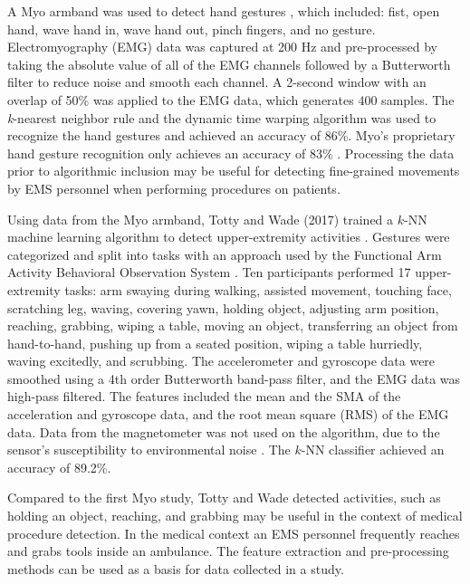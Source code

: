 \par A Myo armband was used to detect hand gestures \cite{Benalcazar2017}, which included: fist, open hand, wave hand in, wave hand out, pinch fingers, and no gesture. Electromyography (\gls{EMG}) data was captured at 200 Hz and pre-processed by taking the absolute value of all of the EMG channels followed by a Butterworth filter to reduce noise and smooth each channel. A 2-second window with an overlap of 50\% was applied to the EMG data, which generates 400 samples. The \emph{k}-nearest neighbor rule and the dynamic time warping algorithm was used to recognize the hand gestures and achieved an accuracy of 86\%. Myo's proprietary hand gesture recognition only achieves an accuracy of 83\% \cite{Benalcazar2017}. Processing the data prior to algorithmic inclusion may be useful for detecting fine-grained movements by EMS personnel when performing procedures on patients.
\par Using data from the Myo armband, Totty and Wade (2017) trained a $k$-NN machine learning algorithm to detect upper-extremity activities \cite{Totty2017}. Gestures were categorized and split into tasks with an approach used by the Functional Arm Activity Behavioral Observation System \cite{FAABOS}. Ten participants performed 17 upper-extremity tasks: arm swaying during walking, assisted movement, touching face, scratching leg, waving, covering yawn, holding object, adjusting arm position, reaching, grabbing, wiping a table, moving an object, transferring an object from hand-to-hand, pushing up from a seated position, wiping a table hurriedly, waving excitedly, and scrubbing. The accelerometer and gyroscope data were smoothed using a 4th order Butterworth band-pass filter, and the EMG data was high-pass filtered. The features included the mean and the \gls{SMA} of the acceleration and gyroscope data, and the root mean square (\gls{RMS}) of the \gls{EMG} data. Data from the magnetometer was not used on the algorithm, due to the sensor's susceptibility to environmental noise \cite{Ahmad2013}. The $k$-NN classifier achieved an accuracy of 89.2\%.
\par Compared to the first Myo study, Totty and Wade detected activities, such as holding an object, reaching, and grabbing may be useful in the context of medical procedure detection. In the medical context an EMS personnel frequently reaches and grabs tools inside an ambulance. The feature extraction and pre-processing methods can be used as a basis for data collected in a study.
